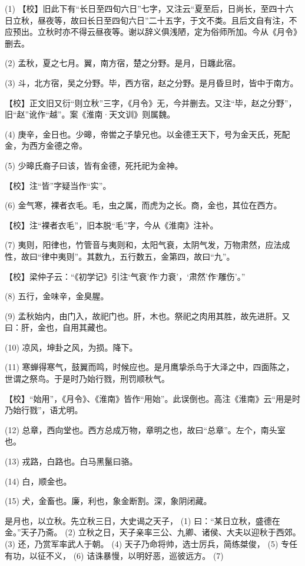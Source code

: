 \documentclass[12pt,UTF8]{ctexbook}
\begin{document}
(1) 【校】旧此下有“长日至四旬六日”七字，又注云“夏至后，日尚长，至四十六日立秋，昼夜等，故曰长日至四旬六日”二十五字，于文不类。且后文自有注，不应预出。立秋时亦不得云昼夜等。谢以辞义俱浅陋，定为俗师所加。今从《月令》删去。

(2) 孟秋，夏之七月。翼，南方宿，楚之分野。是月，日躔此宿。

(3) 斗，北方宿，吴之分野。毕，西方宿，赵之分野。是月昏旦时，皆中于南方。

【校】正文旧又衍“则立秋”三字，《月令》无，今并删去。又注“毕，赵之分野”，旧“赵”讹作“越”。案《淮南·天文训》则属魏。

(4) 庚辛，金日也。少暤，帝喾之子挚兄也。以金德王天下，号为金天氏，死配金，为西方金德之帝。

(5) 少暤氏裔子曰该，皆有金德，死托祀为金神。

【校】注“皆”字疑当作“实”。

(6) 金气寒，裸者衣毛。毛，虫之属，而虎为之长。商，金也，其位在西方。

【校】注“裸者衣毛”，旧本脱“毛”字，今从《淮南》注补。

(7) 夷则，阳律也，竹管音与夷则和，太阳气衰，太阴气发，万物肃然，应法成性，故曰“律中夷则”。其数九，五行数五，金第四，故曰“九”。

【校】梁仲子云：“《初学记》引注‘气衰’作‘力衰’，‘肃然’作‘雕伤’。”

(8) 五行，金味辛，金臭腥。

(9) 孟秋始内，由门入，故祀门也。肝，木也。祭祀之肉用其胜，故先进肝。又曰：肝，金也，自用其藏也。

(10) 凉风，坤卦之风，为损。降下。

(11) 寒蝉得寒气，鼓翼而鸣，时候应也。是月鹰挚杀鸟于大泽之中，四面陈之，世谓之祭鸟。于是时乃始行戮，刑罚顺秋气。

【校】“始用”，《月令》、《淮南》皆作“用始”。此误倒也。高注《淮南》云“用是时乃始行戮”，语尤明。

(12) 总章，西向堂也。西方总成万物，章明之也，故曰“总章”。左个，南头室也。

(13) 戎路，白路也。白马黑鬣曰骆。

(14) 白，顺金也。

(15) 犬，金畜也。廉，利也，象金断割。深，象阴闭藏。

是月也，以立秋。先立秋三日，大史谒之天子， (1) 曰：“某日立秋，盛德在金。”天子乃斋。 (2) 立秋之日，天子亲率三公、九卿、诸侯、大夫以迎秋于西郊。 (3) 还，乃赏军率武人于朝。 (4) 天子乃命将帅，选士厉兵，简练桀俊， (5) 专任有功，以征不义， (6) 诘诛暴慢，以明好恶，巡彼远方。 (7)
\end{document}
